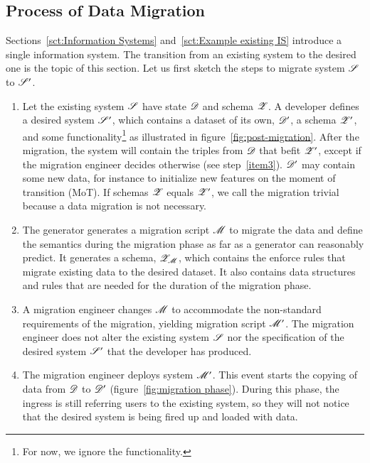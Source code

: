 \documentclass{elsarticle}
\begin{document}
\subsection{Process of Data Migration}
   Sections~\ref{sct:Information Systems} and~\ref{sct:Example existing IS} introduce a single information system.
   The transition from an existing system to the desired one is the topic of this section.
   Let us first sketch the steps to migrate system $\mathscr{S}$ to $\mathscr{S}'$.
\begin{enumerate}
   \item Let the existing system $\mathscr{S}$ have state $\mathscr{D}$ and schema $\mathscr{Z}$.
         A developer defines a desired system $\mathscr{S}'$, which contains a dataset of its own, $\mathscr{D}'$, a schema $\mathscr{Z}'$, and some functionality\footnote{For now, we ignore the functionality.} as illustrated in figure~\ref{fig:post-migration}.
         After the migration, the system will contain the triples from $\mathscr{D}$ that befit $\mathscr{Z}'$,
         except if the migration engineer decides otherwise (see step~\ref{item3}).
         $\mathscr{D}'$ may contain some new data,
         for instance to initialize new features on the moment of transition (MoT).
         If schemas $\mathscr{Z}$ equals $\mathscr{Z}'$, we call the migration trivial because a data migration is not necessary.
   \item The generator generates a migration script $\mathscr{M}$
         to migrate the data and define the semantics during the migration phase as far as a generator can reasonably predict.
         It generates a schema, $\mathscr{Z}_{\mathscr{M}}$, which contains the enforce rules that migrate existing data to the desired dataset.
         It also contains data structures and rules that are needed for the duration of the migration phase.
   \item\label{item3}
         A migration engineer changes $\mathscr{M}$ to accommodate the non-standard requirements of the migration,
         yielding migration script $\mathscr{M}'$.
         The migration engineer does not alter the existing system $\mathscr{S}$ nor the specification
         of the desired system $\mathscr{S}'$ that the developer has produced.
   \item The migration engineer deploys system $\mathscr{M}'$.
         This event starts the copying of data from $\mathscr{D}$ to $\mathscr{D}'$ (figure~\ref{fig:migration phase}).
         During this phase, the ingress is still referring users to the existing system,
         so they will not notice that the desired system is being fired up and loaded with data.

\end{enumerate}
\end{document}
